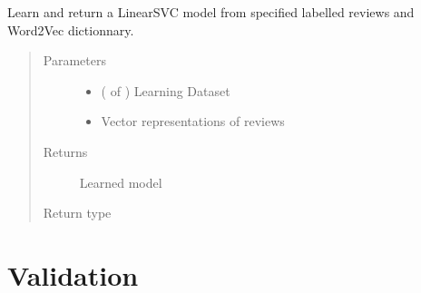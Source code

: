 \documentclass[letterpaper,10pt,english]{sphinxmanual}
\begin{document}

\begin{fulllineitems}
\label{\detokenize{learning:loacore.learning.svm.learn_model}}
Learn and return a LinearSVC model from specified labelled reviews and Word2Vec dictionnary.
\begin{quote}\begin{description}
\item[{Parameters}] \leavevmode\begin{itemize}
\item {} 
 ( of {\hyperref[\detokenize{classes:loacore.classes.classes.Review}]{}}) \textendash{} Learning Dataset

\item {} 
 \textendash{} Vector representations of reviews

\end{itemize}

\item[{Returns}] \leavevmode
Learned model

\item[{Return type}] \leavevmode



\end{description}\end{quote}

\end{fulllineitems}



\section{Validation}
\label{\detokenize{learning:module-loacore.learning.validation}}\label{\detokenize{learning:validation}}
\end{document}
